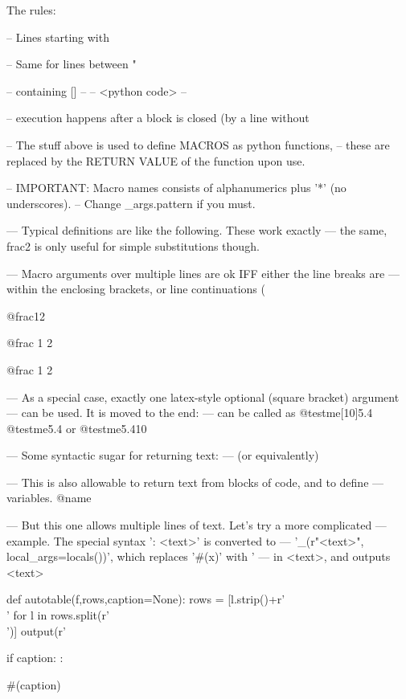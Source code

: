 The rules:

-- Lines starting with %

-- Same for lines between "{%
-- containing [{}]%
--  {%
--  <python code>
--  }%

-- execution happens after a block is closed (by a line without %

-- The stuff above is used to define MACROS as python functions,
-- these are replaced by the RETURN VALUE of the function upon use.

-- IMPORTANT: Macro names consists of alphanumerics plus '*' (no underscores).
-- Change _args.pattern if you must.

--- Typical definitions are like the following. These work exactly
--- the same, frac2 is only useful for simple substitutions though.




--- Macro arguments over multiple lines are ok IFF either the line breaks are
--- within the enclosing brackets, or line continuations (%

@frac{1}{2}

@frac  {1}  {2}

@frac{
1}%
{2}

--- As a special case, exactly one latex-style optional (square bracket) argument
--- can be used. It is moved to the end:
--- can be called as
@testme[10]{5.4}
@testme{5.4}
or
@testme{5.4}{10}

--- Some syntactic sugar for returning text:
--- (or equivalently)

--- This is also allowable to return text from blocks of code, and to define
--- variables.
@name


--- But this one allows multiple lines of text. Let's try a more complicated
--- example. The special syntax ': <text>' is converted to
--- '_(r"<text>", local_args=locals())', which replaces '#(x)' with '%
--- in <text>, and outputs <text>%
{%
def autotable(f,rows,caption=None):
    rows = [l.strip()+r'\\' for l in rows.split(r'\\')]
    output(r'
    if caption:
        :\caption{#(caption)}
}%

}
